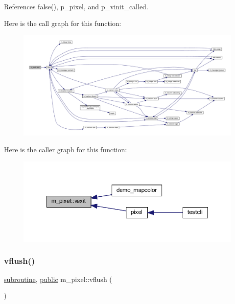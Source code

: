 References false(), p\+\_\+pixel, and p\+\_\+vinit\+\_\+called.

Here is the call graph for this function\+:
\nopagebreak
\begin{figure}[H]
\begin{center}
\leavevmode
\includegraphics[width=350pt]{namespacem__pixel_a19ad6b65752322b0029a62cc0ebec3e8_cgraph}
\end{center}
\end{figure}
Here is the caller graph for this function\+:
\nopagebreak
\begin{figure}[H]
\begin{center}
\leavevmode
\includegraphics[width=350pt]{namespacem__pixel_a19ad6b65752322b0029a62cc0ebec3e8_icgraph}
\end{center}
\end{figure}
\mbox{\label{namespacem__pixel_ae74cf11194379dbf13069a61b06589a2}} 
\subsubsection{\texorpdfstring{vflush()}{vflush()}}
{\footnotesize\ttfamily \hyperlink{M__stopwatch_83_8txt_acfbcff50169d691ff02d4a123ed70482}{subroutine}, \hyperlink{M__stopwatch_83_8txt_a2f74811300c361e53b430611a7d1769f}{public} m\+\_\+pixel\+::vflush (\begin{DoxyParamCaption}{ }\end{DoxyParamCaption})}

